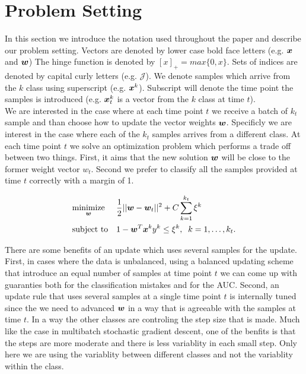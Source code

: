 \section{Problem Setting}

In this section we introduce the notation used throughout the paper and describe our problem setting. Vectors are denoted by lower case bold face letters (e.g. $\bm{x}$ and $\bm{w}$) 
The hinge function is denoted by $[x]_+ = max\{0, x\} $. Sets of indices are denoted by capital curly letters (e.g. $\mathcal{J}$). We denote samples which arrive from the $k$ class using superscript (e.g. $\bm{x}^k$). Subscript will denote the time point the samples is introduced (e.g. $\bm{x}^k_t$ is a vector from the $k$ class at time $t$). \\

We are interested in the case where at each time point $t$ we receive a batch of $k_t$ sample and than choose how to update the vector weights $\bm{w}$. Specificly we are interest in the case where each of the $k_t$ samples arrives from a different class. At each time point $t$ we solve an optimization problem which performs a trade off between two things. First, it aims that the new solution $\bm{w}$ will be close to the former weight vector $w_t$. Second we prefer to classify all the samples provided at time $t$ correctly with a margin of 1.

\begin{equation*}
\begin{aligned}
& \underset{\bm{w}}{\text{minimize}}
& & \frac{1}{2} || \bm{w} - \bm{w}_t ||^2 + C \sum\limits_{k=1}^{k_t}{\xi^k} \\
& \text{subject to}
& & 1 - \bm{w}^T \bm{x}^k y^k \leq \xi^k, \;
 \; k = 1, \ldots, k_t.
\end{aligned}
\end{equation*}

There are some benefits of an update which uses several samples for the update. First, in cases where the data is unbalanced, using a balanced updating scheme that introduce an equal number of samples at time point $t$ we can come up with guaranties both for the classification mistakes and for the AUC.
Second, an update rule that uses several samples at a single time point $t$ is internally tuned since the we need to advanced $\bm{w}$ in a way that is agreeable with the samples at time $t$. In a way the other classes are controling the step size that is made. Much like the case in multibatch stochastic gradient descent, one of the benfits is that the steps are more moderate and there is less variablity in each small step. Only here we are using the variablity between different classes and not the variablity within the class.